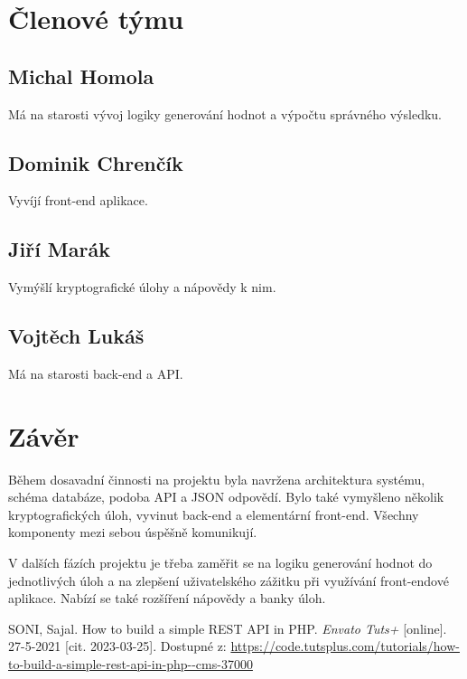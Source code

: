 \documentclass[titlepage]{article}
\begin{document}
\section{Členové týmu}
\subsection*{Michal Homola}
Má na starosti vývoj logiky generování hodnot a výpočtu správného výsledku.
\subsection*{Dominik Chrenčík}
Vyvíjí front-end aplikace.
\subsection*{Jiří Marák}
Vymýšlí kryptografické úlohy a nápovědy k nim.
\subsection*{Vojtěch Lukáš}
Má na starosti back-end a API. 

\section*{Závěr}
Během dosavadní činnosti na projektu byla navržena architektura systému, schéma databáze, podoba API a JSON odpovědí. Bylo také vymyšleno několik kryptografických úloh, vyvinut back-end a elementární front-end. Všechny komponenty mezi sebou úspěšně komunikují.

V dalších fázích projektu je třeba zaměřit se na logiku generování hodnot do jednotlivých úloh a na zlepšení uživatelského zážitku při využívání front-endové aplikace. Nabízí se také rozšíření nápovědy a banky úloh.



\begin{thebibliography}{9}
    SONI, Sajal. How to build a simple REST API in PHP. \emph{En\-va\-to Tuts+} [on\-li\-ne]. 27-5-2021 [cit. 2023-03-25]. Dostupné z: \url{https://code.tutsplus.com/tutorials/how-to-build-a-simple-rest-api-in-php--cms-37000}
\end{thebibliography}
\end{document}
